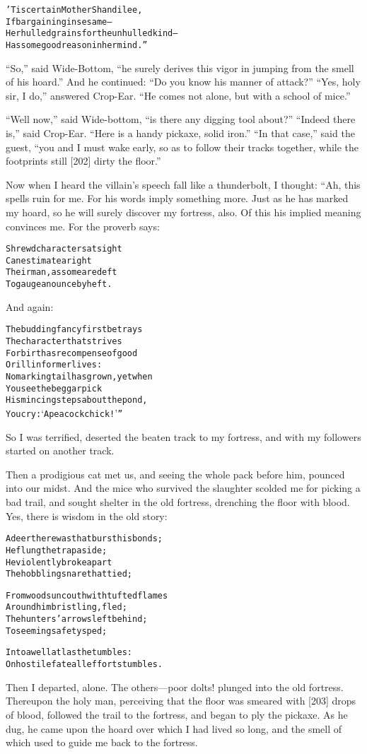 \documentclass{article}
\renewenvironment{verbatim}{\begin{alltt}\normalfont\begin{centering}}{\end{centering}\end{alltt}}
\begin{document}
\begin{verbatim}
'Tis certain Mother Shandilee,
If bargaining in sesame--
Her hulled grains for the unhulled kind--
Has some good reason in her mind.”                      
\end{verbatim}
``So,'' said Wide-Bottom,
``he surely derives this vigor in jumping from the smell of his hoard.''
And he continued: ``Do you know his manner of attack?''
``Yes, holy sir, I do,'' answered Crop-Ear.
``He comes not alone, but with a school of mice.''

``Well now,'' said Wide-bottom,
``is there any digging tool about?'' ``Indeed there is,'' said
Crop-Ear. ``Here is a handy pickaxe, solid iron.''
``In that case,'' said the guest,
``you and I must wake early, so as to follow their tracks together, while the footprints still [202] dirty the floor.''

Now when I heard the villain's speech fall like a thunderbolt, I
thought: “Ah, this spells ruin for me. For his words imply
something more. Just as he has marked my hoard, so he will surely
discover my fortress, also. Of this his implied meaning convinces
me. For the proverb says:

\begin{verbatim}
Shrewd characters at sight
Can estimate aright
Their man, as some are deft
To gauge an ounce by heft.
\end{verbatim}
And again:

\begin{verbatim}
The budding fancy first betrays
    The character that strives
For birth as recompense of good
    Or ill in former lives:
No marking tail has grown, yet when
    You see the beggar pick
His mincing steps about the pond,
    You cry: ‘A peacock chick!’”
\end{verbatim}
So I was terrified, deserted the beaten track to my fortress, and
with my followers started on another track.

Then a prodigious cat met us, and seeing the whole pack before him,
pounced into our midst. And the mice who survived the slaughter
scolded me for picking a bad trail, and sought shelter in the old
fortress, drenching the floor with blood. Yes, there is wisdom in
the old story:

\begin{verbatim}
A deer there was that burst his bonds;
    He flung the trap aside;
He violently broke apart
    The hobbling snare that tied;

From woods uncouth with tufted flames
    Around him bristling, fled;
The hunters' arrows left behind;
    To seeming safety sped;

Into a well at last he tumbles:
On hostile fate all effort stumbles.
\end{verbatim}
Then I departed, alone. The others---poor dolts! plunged into the
old fortress. Thereupon the holy man, perceiving that the floor was
smeared with [203] drops of blood, followed the trail to the
fortress, and began to ply the pickaxe. As he dug, he came upon the
hoard over which I had lived so long, and the smell of which used
to guide me back to the fortress.
\end{document}
